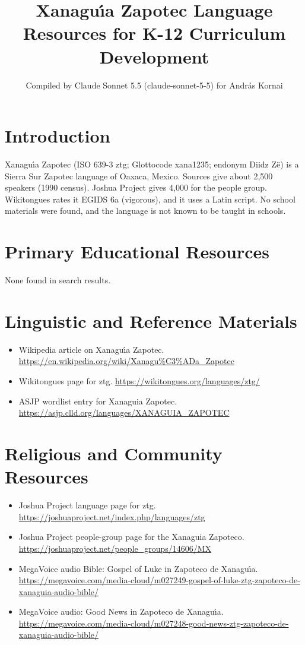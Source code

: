 \documentclass[12pt]{article}
\title{Xanagu\'{\i}a Zapotec Language Resources for K-12 Curriculum Development}
\author{Compiled by Claude Sonnet 5.5 (claude-sonnet-5-5) for Andr\'as Kornai}
\date{}
\begin{document}
\maketitle

\section{Introduction}
Xanagu\'{\i}a Zapotec (ISO 639-3 ztg; Glottocode xana1235; endonym Diidz Z\"e) is a Sierra Sur Zapotec language of Oaxaca, Mexico. Sources give about 2,500 speakers (1990 census). Joshua Project gives 4,000 for the people group. Wikitongues rates it EGIDS 6a (vigorous), and it uses a Latin script. No school materials were found, and the language is not known to be taught in schools.

\section{Primary Educational Resources}
None found in search results.

\section{Linguistic and Reference Materials}
\begin{itemize}
\item Wikipedia article on Xanagu\'{\i}a Zapotec. \url{https://en.wikipedia.org/wiki/Xanagu%C3%ADa_Zapotec}
\item Wikitongues page for ztg. \url{https://wikitongues.org/languages/ztg/}
\item ASJP wordlist entry for Xanaguia Zapotec. \url{https://asjp.clld.org/languages/XANAGUIA_ZAPOTEC}
\end{itemize}

\section{Religious and Community Resources}
\begin{itemize}
\item Joshua Project language page for ztg. \url{https://joshuaproject.net/index.php/languages/ztg}
\item Joshua Project people-group page for the Xanaguia Zapoteco. \url{https://joshuaproject.net/people_groups/14606/MX}
\item MegaVoice audio Bible: Gospel of Luke in Zapoteco de Xanagu\'{\i}a. \url{https://megavoice.com/media-cloud/m027249-gospel-of-luke-ztg-zapoteco-de-xanaguia-audio-bible/}
\item MegaVoice audio: Good News in Zapoteco de Xanagu\'{\i}a. \url{https://megavoice.com/media-cloud/m027248-good-news-ztg-zapoteco-de-xanaguia-audio-bible/}
\end{itemize}
\end{document}
